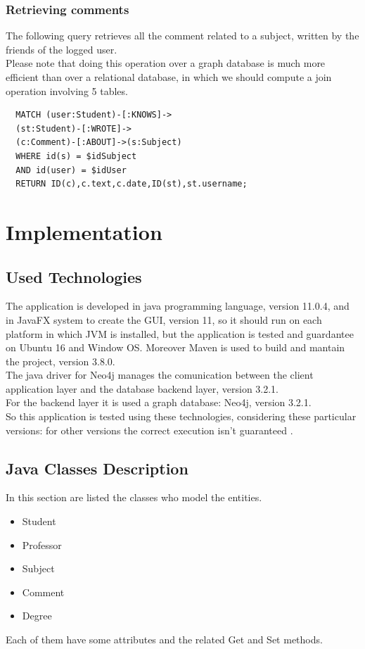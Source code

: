 \documentclass[a4paper]{article}
\begin{document}
\subsubsection{Retrieving comments}
The following query retrieves all the comment related to a subject, written by the friends of the logged user.\\
Please note that doing this operation over a graph database is much more efficient than over a relational database, in which we should compute a join operation involving 5 tables.
\begin{verbatim}
  MATCH (user:Student)-[:KNOWS]-> 
  (st:Student)-[:WROTE]->  
  (c:Comment)-[:ABOUT]->(s:Subject)  
  WHERE id(s) = $idSubject  
  AND id(user) = $idUser  
  RETURN ID(c),c.text,c.date,ID(st),st.username;
\end{verbatim}
\clearpage
\section{Implementation}

\subsection{Used Technologies}
The application is developed in java programming language, version 11.0.4, and in JavaFX system to create the GUI, version 11, so it should run on each platform in which JVM is installed, but the application is tested and guardantee on Ubuntu 16 and Window OS. Moreover Maven is used  to build and mantain the project, version 3.8.0. \\
The java driver for Neo4j manages the comunication between the client application layer and the database backend layer, version 3.2.1.\\ 
For the backend layer it is used a graph database: Neo4j, version 3.2.1.\\
So this application is tested using these technologies, considering these particular versions: for other versions the correct execution isn't guaranteed .

\subsection{Java Classes Description}

In this section are listed the classes who model the entities.
\begin{itemize}
\item Student
\item Professor
\item Subject
\item Comment
\item Degree
\end{itemize}
Each of them have some attributes and the related Get and Set methods.
\end{document}
